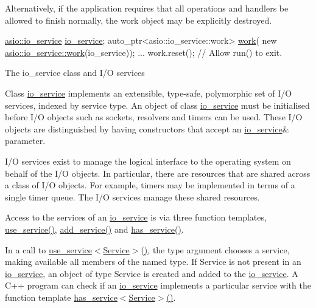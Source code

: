 Alternatively, if the application requires that all operations and handlers be allowed to finish normally, the work object may be explicitly destroyed.


\begin{DoxyCode}
 \hyperlink{classasio_1_1io__service}{asio::io\_service} \hyperlink{classasio_1_1io__service_ac843d46058d711a8ce0cc5f98acc116e}{io\_service};
auto\_ptr<asio::io\_service::work> \hyperlink{classasio_1_1io__service_ab4659d3bc91cdcd7ca7a05329278ee88}{work}(
    \textcolor{keyword}{new} \hyperlink{classasio_1_1io__service_1_1work}{asio::io\_service::work}(io\_service));
...
work.reset(); \textcolor{comment}{// Allow run() to exit. }
\end{DoxyCode}


\begin{DoxyParagraph}{The io\+\_\+service class and I/\+O services}

\end{DoxyParagraph}
Class \hyperlink{classasio_1_1io__service}{io\+\_\+service} implements an extensible, type-\/safe, polymorphic set of I/\+O services, indexed by service type. An object of class \hyperlink{classasio_1_1io__service}{io\+\_\+service} must be initialised before I/\+O objects such as sockets, resolvers and timers can be used. These I/\+O objects are distinguished by having constructors that accept an {\ttfamily \hyperlink{classasio_1_1io__service}{io\+\_\+service}\&} parameter.

I/\+O services exist to manage the logical interface to the operating system on behalf of the I/\+O objects. In particular, there are resources that are shared across a class of I/\+O objects. For example, timers may be implemented in terms of a single timer queue. The I/\+O services manage these shared resources.

Access to the services of an \hyperlink{classasio_1_1io__service}{io\+\_\+service} is via three function templates, \hyperlink{classasio_1_1io__service_a8e909785743737fed207a4c058399d7e}{use\+\_\+service()}, \hyperlink{classasio_1_1io__service_a24cdada519607ebd767d5c01d144a48c}{add\+\_\+service()} and \hyperlink{classasio_1_1io__service_aac11cfb5d1790b8dfa320277035e1a5f}{has\+\_\+service()}.

In a call to {\ttfamily \hyperlink{classasio_1_1io__service_a8e909785743737fed207a4c058399d7e}{use\+\_\+service$<$\+Service$>$()}}, the type argument chooses a service, making available all members of the named type. If {\ttfamily Service} is not present in an \hyperlink{classasio_1_1io__service}{io\+\_\+service}, an object of type {\ttfamily Service} is created and added to the \hyperlink{classasio_1_1io__service}{io\+\_\+service}. A C++ program can check if an \hyperlink{classasio_1_1io__service}{io\+\_\+service} implements a particular service with the function template {\ttfamily \hyperlink{classasio_1_1io__service_aac11cfb5d1790b8dfa320277035e1a5f}{has\+\_\+service$<$\+Service$>$()}}.

